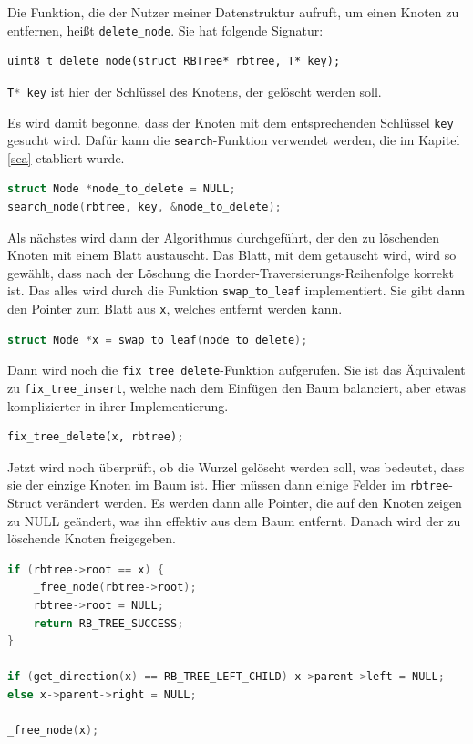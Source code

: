\documentclass[11pt]{article}
\newcommand{\lstin}[1]{\lstinline[language=C]{#1}}
\begin{document}
Die Funktion, die der Nutzer meiner Datenstruktur aufruft, um einen Knoten zu entfernen, heißt \lstin{delete_node}.
Sie hat folgende Signatur:

\begin{lstlisting}
uint8_t delete_node(struct RBTree* rbtree, T* key);
\end{lstlisting}

\lstin{T* key} ist hier der Schlüssel des Knotens, der gelöscht werden soll.

Es wird damit begonne, dass der Knoten mit dem entsprechenden Schlüssel \lstin{key} gesucht wird.
Dafür kann die \lstin{search}-Funktion verwendet werden, die im Kapitel \ref{sea} etabliert wurde.

\begin{lstlisting}[language=C]
struct Node *node_to_delete = NULL;
search_node(rbtree, key, &node_to_delete);
\end{lstlisting}

Als nächstes wird dann der Algorithmus durchgeführt, der den zu löschenden Knoten mit einem Blatt austauscht.
Das Blatt, mit dem getauscht wird, wird so gewählt, dass nach der Löschung die Inorder-Traversierungs-Reihenfolge korrekt ist.
Das alles wird durch die Funktion \lstin{swap_to_leaf} implementiert. Sie gibt dann den Pointer zum Blatt aus \lstin{x}, welches entfernt werden kann.
\begin{lstlisting}[language=C]
struct Node *x = swap_to_leaf(node_to_delete);
\end{lstlisting}

Dann wird noch die \lstin{fix_tree_delete}-Funktion aufgerufen.
Sie ist das Äquivalent zu \lstin{fix_tree_insert}, welche nach dem Einfügen den Baum balanciert,
aber etwas komplizierter in ihrer Implementierung.

\begin{lstlisting}
fix_tree_delete(x, rbtree);
\end{lstlisting}

Jetzt wird noch überprüft, ob die Wurzel gelöscht werden soll, was bedeutet,
dass sie der einzige Knoten im Baum ist. Hier müssen dann einige Felder im \lstin{rbtree}-Struct
verändert werden. Es werden dann alle Pointer, die auf den Knoten zeigen zu NULL geändert,
was ihn effektiv aus dem Baum entfernt. Danach wird der zu löschende Knoten freigegeben.

\begin{lstlisting}[language=C]
if (rbtree->root == x) {
    _free_node(rbtree->root);
    rbtree->root = NULL;
    return RB_TREE_SUCCESS;
}

if (get_direction(x) == RB_TREE_LEFT_CHILD) x->parent->left = NULL;
else x->parent->right = NULL;

_free_node(x);
\end{lstlisting}
\end{document}
